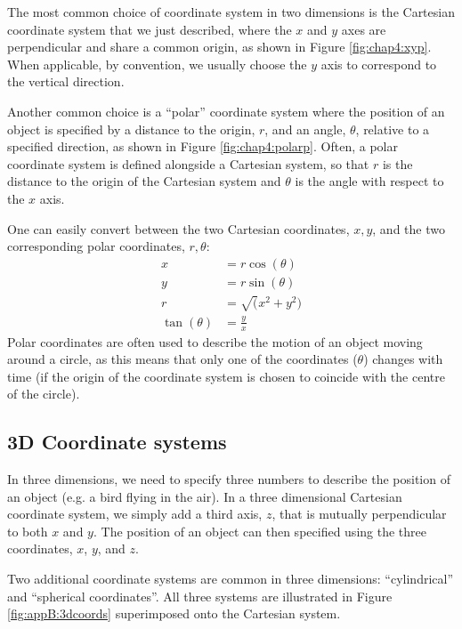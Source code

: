 The most common choice of coordinate system in two dimensions is the Cartesian coordinate system that we just described, where the $x$ and $y$ axes are perpendicular and share a common origin, as shown in Figure \ref{fig:chap4:xyp}. When applicable, by convention, we usually choose the $y$ axis to correspond to the vertical direction.

Another common choice is a ``polar'' coordinate system where the position of an object is specified by a distance to the origin, $r$, and an angle, $\theta$, relative to a specified direction, as shown in Figure \ref{fig:chap4:polarp}. Often, a polar coordinate system is defined alongside a Cartesian system, so that $r$ is the distance to the origin of the Cartesian system and $\theta$ is the angle with respect to the $x$ axis.

One can easily convert between the two Cartesian coordinates, $x,y$, and the two corresponding polar coordinates, $r,\theta$:
\begin{align*}
x&=r\cos(\theta)\\
y&=r\sin(\theta)\\
r&=\sqrt(x^2+y^2)\\
\tan(\theta) &= \frac{y}{x}
\end{align*}
Polar coordinates are often used to describe the motion of an object moving around a circle, as this means that only one of the coordinates ($\theta$) changes with time (if the origin of the coordinate system is chosen to coincide with the centre of the circle).

\subsection{3D Coordinate systems}
In three dimensions, we need to specify three numbers to describe the position of an object (e.g. a bird flying in the air). In a three dimensional Cartesian coordinate system, we simply add a third axis, $z$, that is mutually perpendicular to both $x$ and $y$. The position of an object can then specified using the three coordinates, $x$, $y$, and $z$. 

Two additional coordinate systems are common in three dimensions: ``cylindrical'' and ``spherical coordinates''. All three systems are illustrated in Figure \ref{fig:appB:3dcoords} superimposed onto the Cartesian system.

